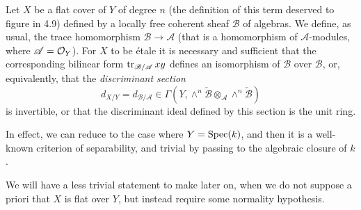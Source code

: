 \begin{prop}
    Let $X$ be a flat cover of $Y$ of degree $n$ (the definition of this term deserved to figure in 4.9) defined by a locally free coherent sheaf $\mathscr{B}$ of algebras.
    We define, as usual, the trace homomorphism $\mathscr{B}\to\mathscr{A}$ (that is a homomorphism of $\mathscr{A}$-modules, where $\mathscr{A}=\mathcal{O}_Y$).
    For $X$ to be étale it is necessary and sufficient that the corresponding bilinear form $\operatorname{tr}_{\mathscr{B}/\mathscr{A}}xy$ defines an isomorphism of $\mathscr{B}$ over $\mathscr{B}$, or, equivalently, that the \emph{discriminant section}
    \begin{equation*}
        d_{X/Y}=d_{\mathscr{B}/\mathscr{A}}\in\Gamma(Y,\wedge^n\check{\mathscr{B}}\otimes_\mathscr{A}\wedge^n\check{\mathscr{B}})
    \end{equation*}
    is invertible, or that the discriminant ideal defined by this section is the unit ring.
\end{prop}

In effect, we can reduce to the case where $Y=\operatorname{Spec}(k)$, and then it is a well-known criterion of separability, and trivial by passing to the algebraic closure of $k$.

\begin{rem}
    We will have a less trivial statement to make later on, when we do not suppose a priori that $X$ is flat over $Y$, but instead require some normality hypothesis.
\end{rem}
